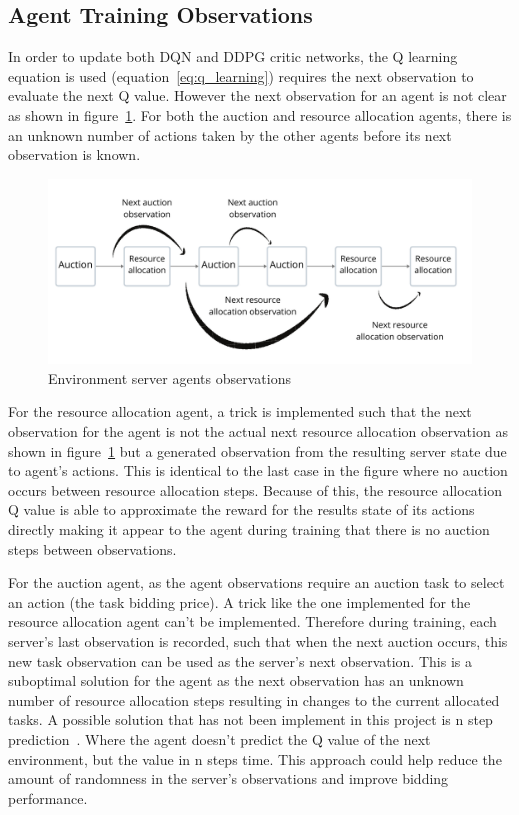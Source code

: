 \subsection{Agent Training Observations}\label{subsec:agent-training-observations}
In order to update both DQN and DDPG critic networks, the Q learning equation is used (equation~\eqref{eq:q_learning})
requires the next observation to evaluate the next Q value. However the next observation for an
agent is not clear as shown in figure~\ref{fig:environment-observations}. For both the auction and resource allocation
agents, there is an unknown number of actions taken by the other agents before its next observation is known.

\begin{figure}[h]
    \centering
    \includegraphics[width=14cm]{figures/3_implementation_figs/env_server_agents_observations.pdf}
    \caption{Environment server agents observations}
    \label{fig:environment-observations}
\end{figure}

For the resource allocation agent, a trick is implemented such that the next observation for the agent is not the
actual next resource allocation observation as shown in figure~\ref{fig:environment-observations} but a generated
observation from the resulting server state due to agent's actions. This is identical to the last case in the figure
where no auction occurs between resource allocation steps. Because of this, the resource allocation Q value is able to
approximate the reward for the results state of its actions directly making it appear to the agent during training that
there is no auction steps between observations.

For the auction agent, as the agent observations require an auction task to select an action (the task bidding price).
A trick like the one implemented for the resource allocation agent can't be implemented. Therefore during training,
each server's last observation is recorded, such that when the next auction occurs, this new task observation can be
used as the server's next observation. This is a suboptimal solution for the agent as the next observation
has an unknown number of resource allocation steps resulting in changes to the current allocated tasks.
A possible solution that has not been implement in this project is n step prediction~\citep{multi-step-dqn}. Where the
agent doesn't predict the Q value of the next environment, but the value in n steps time. This approach could help
reduce the amount of randomness in the server's observations and improve bidding performance.

